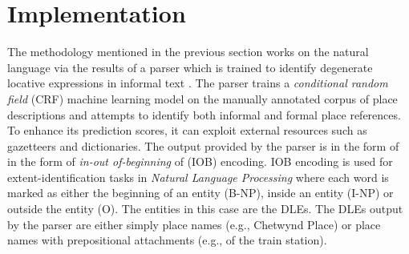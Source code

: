 \documentclass{sig-alternate}
\begin{document}


\section{Implementation}
The methodology mentioned in the previous section works on the natural language via the results of a parser which is trained to identify degenerate locative expressions in informal text \cite{fei:locative}. The parser trains a \textit{conditional random field} (CRF) machine learning model on the manually annotated corpus of place descriptions \cite{tuw} and attempts to identify both informal and formal place references. To enhance its prediction scores, it can exploit external resources such as gazetteers and dictionaries. The output provided by the parser is in the form of in the form of \textit{in-out of-beginning} of (IOB) encoding. IOB encoding is used for extent-identification tasks in \textit{Natural Language Processing} where each word is marked as either the beginning of an entity (B-NP), inside an entity (I-NP) or outside the entity (O). The entities in this case are the DLEs. 
The DLEs output by the parser are either simply place names (e.g., Chetwynd Place) or place names with prepositional attachments (e.g., of the train station).
\end{document}
